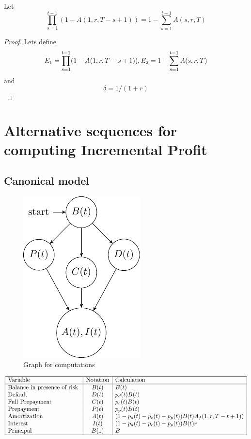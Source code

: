 \documentclass[12pt]{book}
\newenvironment{theorem}[2][Theorem]{\begin{trivlist}
\item[\hskip \labelsep {\bfseries #1}\hskip \labelsep {\bfseries #2.}]}{\end{trivlist}}
\begin{document}
\begin{theorem}{1.1 (Telescopic amortizations)}{} \label{teo:1}
Let
\[
\prod^{t-1}_{s=1}(1-A(1,r,T-s+1))=1-\sum^{t-1}_{s=1}A(s,r,T)
\]
\end{theorem}

\begin{proof}{}{} Lets define
\[
E_1=\prod^{t-1}_{s=1}(1-A(1,r,T-s+1)), \\
E_2 =1-\sum^{t-1}_{s=1}A(s,r,T)
\]
and
\[
\delta =1/(1+r)
\]


\end{proof}

\section{Alternative sequences for computing Incremental Profit}



\subsection{Canonical model}
\begin{figure}[H]
  \centering
      \includegraphics[width=.3\textwidth]{Graph2.pdf} 
 \caption{Graph for computations}
 \label{fig:graph2}
\end{figure}

\begin{center} %
\[ %
\begin{array}{|l|c|l|} \hline %
\mbox{Variable} &\mbox{Notation} & \mbox{Calculation}\\ \hline
\mbox{Balance in presence of risk }  & B(t)  & B(t)\\
\mbox{Default  }  & D(t) & p_d(t) B(t)\\
\mbox{Full Prepayment}  & C(t) & p_c(t) B(t)\\
\mbox{Prepayment  }  & P(t) & p_p(t)B(t)\\
\mbox{Amortization}  & A(t) &(1-p_d(t)-p_c(t)-p_p(t)) B(t)A_f(1,r,T-t+1))\\
\mbox{Interest }  & I(t) & (1-p_d(t)-p_c(t)-p_p(t))B(t)r\\
\mbox{Principal   }  &  B(1) & B\\
\hline
\end{array} %
\] %
\end{center}
\end{document}
